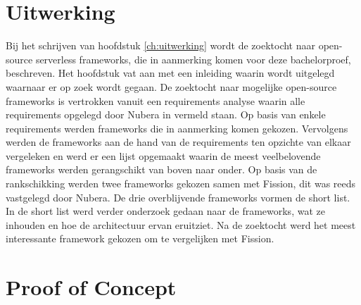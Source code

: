 \section{Uitwerking}
Bij het schrijven van hoofdstuk \ref{ch:uitwerking} wordt de zoektocht naar open-source serverless frameworks, die in aanmerking komen voor deze bachelorproef, beschreven. Het hoofdstuk vat aan met een inleiding waarin wordt uitgelegd waarnaar er op zoek wordt gegaan. De zoektocht naar mogelijke open-source frameworks is vertrokken vanuit een requirements analyse waarin alle requirements opgelegd door Nubera in vermeld staan. Op basis van enkele requirements werden frameworks die in aanmerking komen gekozen. Vervolgens werden de frameworks aan de hand van de requirements ten opzichte van elkaar vergeleken en werd er een lijst opgemaakt waarin de meest veelbelovende frameworks werden gerangschikt van boven naar onder. Op basis van de rankschikking werden twee frameworks gekozen samen met Fission, dit was reeds vastgelegd door Nubera. De drie overblijvende frameworks vormen de short list. In de short list werd verder onderzoek gedaan naar de frameworks, wat ze inhouden en hoe de architectuur ervan eruitziet. Na de zoektocht werd het meest interessante framework gekozen om te vergelijken met Fission.

\section{Proof of Concept}
